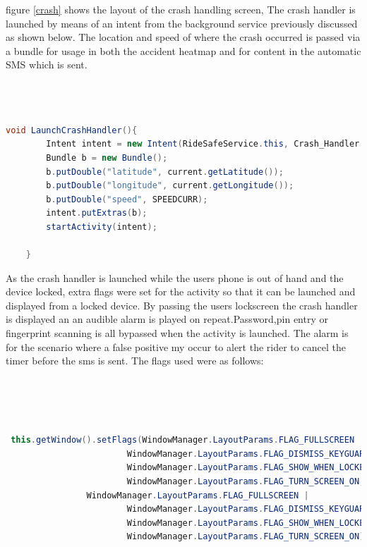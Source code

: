 figure \ref{crash} shows the layout of the crash handling screen, The crash handler is launched by means of an intent from the background service previously discussed as shown below. The location and speed of where the crash occurred is passed via a bundle for usage in both the accident heatmap and for content in the automatic SMS which is sent.

 \begin{lstlisting}[language=Java,basicstyle=\small, breaklines=true, label={lst:labell},caption={Launching the Crash Handler}]



void LaunchCrashHandler(){
        Intent intent = new Intent(RideSafeService.this, Crash_Handler.class).setFlags(Intent.FLAG_ACTIVITY_NEW_TASK);
        Bundle b = new Bundle();
        b.putDouble("latitude", current.getLatitude());
        b.putDouble("longitude", current.getLongitude());
        b.putDouble("speed", SPEEDCURR);
        intent.putExtras(b);
        startActivity(intent);

    }


\end{lstlisting}

As the crash handler is launched while the users phone is  out of hand and the device locked, extra flags were set for the activity so that it can be launched and displayed from a locked device. By passing the users lockscreen the crash handler is displayed an an audible alarm is played on repeat.Password,pin entry or fingerprint scanning is all bypassed when the activity is launched. The alarm is for the scenario where a false positive my occur to alert the rider to cancel the timer before the sms is sent.
The flags used were as follows:
 \begin{lstlisting}[language=Java,basicstyle=\small, breaklines=true, label={lst:labell},caption={Flags to allow device to RideSafe to display the crash handler}]




 this.getWindow().setFlags(WindowManager.LayoutParams.FLAG_FULLSCREEN |
                        WindowManager.LayoutParams.FLAG_DISMISS_KEYGUARD |
                        WindowManager.LayoutParams.FLAG_SHOW_WHEN_LOCKED |
                        WindowManager.LayoutParams.FLAG_TURN_SCREEN_ON,
                WindowManager.LayoutParams.FLAG_FULLSCREEN |
                        WindowManager.LayoutParams.FLAG_DISMISS_KEYGUARD |
                        WindowManager.LayoutParams.FLAG_SHOW_WHEN_LOCKED |
                        WindowManager.LayoutParams.FLAG_TURN_SCREEN_ON);

\end{lstlisting}


